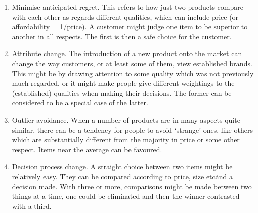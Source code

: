 \begin{enumerate}
	\item Minimise anticipated regret.
	This refers to how just two products compare with each other as regards different qualities, which can include
	price (or affordability = 1/price).
	A customer might judge one item to be superior to another in all respects.
	The first is then a safe choice for the customer.
	\item Attribute change.
	The introduction of a new product onto the market can change the way customers, or at least some of them, view established brands.
	This might be by drawing attention to some quality which was not previously much regarded, or it might make people give different
	weightings to the (established) qualities when making their decisions.
	The former can be considered to be a special case of the latter.
	\item Outlier avoidance.
	When a number of products are in many aspects quite similar, there can be a tendency for people to avoid ‘strange’ ones, like others which
	are substantially different from the majority in price or some other respect.
	Items near the average can be favoured.
	\item Decision process change.
	A straight choice between two items might be relatively easy.
	They can be compared according to price, size etc\. and a decision made.
	With three or more, comparisons might be made between two things at a time, one could be eliminated and then the winner contrasted
	with a third.
\end{enumerate}

